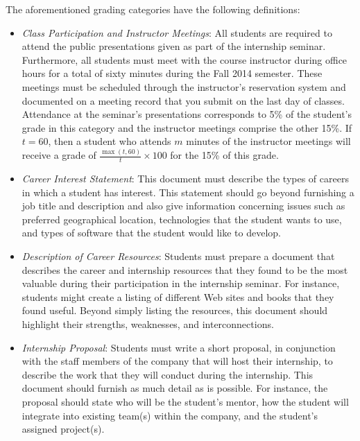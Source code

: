 \noindent
The aforementioned grading categories have the following definitions:

\begin{itemize}

        \item {\em Class Participation and Instructor Meetings}: All students are required to attend the public
          presentations given as part of the internship seminar.  Furthermore, all students must meet with the course
          instructor during office hours for a total of sixty minutes during the Fall 2014 semester.  These meetings
          must be scheduled through the instructor's reservation system and documented on a meeting record that you
          submit on the last day of classes. Attendance at the seminar's presentations corresponds to 5\% of the
          student's grade in this category and the instructor meetings comprise the other 15\%. If $t=60$, then a
          student who attends $m$ minutes of the instructor meetings will receive a grade of $\frac{\max{(t,60)}}{t}\times100$ for the
          15\% of this grade.
		
	\item {\em Career Interest Statement}: This document must describe the types of careers in which a student has
		interest. This statement should go beyond furnishing a job title and description and also give
		information concerning issues such as preferred geographical location, technologies that the student wants to
		use, and types of software that the student would like to develop. 	

	\item {\em Description of Career Resources}:  Students must prepare a document that describes the career and
		internship resources that they found to be the most valuable during their participation in the internship
		seminar. For instance, students might create a listing of different Web sites and books that they found useful. 
		Beyond simply listing the resources, this document should highlight their strengths, weaknesses, and interconnections. 		

	\item {\em Internship Proposal}: Students must write a short proposal, in conjunction with the staff members of the
		company that will host their internship, to describe the work that they will conduct during the internship.
		This document should furnish as much detail as is possible.  For instance, the proposal should state who will be
		the student's mentor, how the student will integrate into existing team(s) within the company, and the
		student's assigned project(s). 


\end{itemize}

